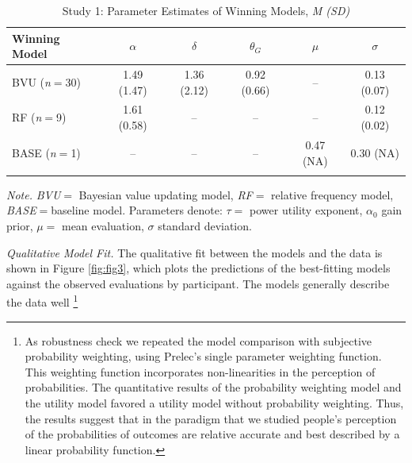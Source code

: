 \documentclass[a4paper, man, floatsintext]{apa6}
\let\rmarkdownfootnote\footnote%
\def\footnote{\protect\rmarkdownfootnote}
\begin{document}
\begin{table}[tbp]

\begin{center}
\begin{threeparttable}

\caption{\label{tab:study1_parameter}Study 1: Parameter Estimates of Winning Models, \textit{M (SD)}}

\begin{tabular}{lccccc}
\toprule
Winning Model & $\alpha$ & $\delta$ & $\theta_G$ & $\mu$ & $\sigma$\\
\midrule
BVU (\textit{n}$=$30) & 1.49 (1.47) & 1.36 (2.12) & 0.92 (0.66) & -- & 0.13 (0.07)\\
RF (\textit{n}$=$9) & 1.61 (0.58) & -- & -- & -- & 0.12 (0.02)\\
BASE (\textit{n}$=$1) & -- & -- & -- & 0.47 (NA) & 0.30 (NA)\\
\bottomrule
\addlinespace
\end{tabular}

\begin{tablenotes}[para]
\normalsize{\textit{Note.} \textit{BVU}$=$ Bayesian value updating model, \textit{RF}$=$ relative frequency model, \textit{BASE}$=$baseline model. Parameters denote: $\tau =$ power utility exponent, $\alpha_0$ gain prior, $\mu=$ mean evaluation, $\sigma$ standard deviation.}
\end{tablenotes}

\end{threeparttable}
\end{center}

\end{table}

\textit{Qualitative Model Fit.} The qualitative fit between the models
and the data is shown in Figure \ref{fig:fig3}, which plots the
predictions of the best-fitting models against the observed evaluations
by participant. The models generally describe the data well
\footnote{As robustness check we repeated the model comparison with subjective probability weighting, using Prelec’s \citeyear{Prelec1998} single parameter weighting function. This weighting function incorporates non-linearities in the perception of probabilities. The quantitative results of the probability weighting model and the utility model favored a utility model without probability weighting. Thus, the results suggest that in the paradigm that we studied people's perception of the probabilities of outcomes are relative accurate and best described by a linear probability function.}
\end{document}
